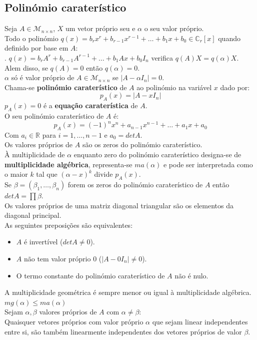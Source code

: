 \documentclass[]{report}
\begin{document}
\subsection{Polinómio caraterístico}
Seja $A\in \mathcal{M}_{n \times n}$, $X$ um vetor próprio seu e $\alpha$ o seu valor próprio.\\[5mm]
Todo o polinómio  $q(x) = b_r x^r + b_{r-1} x^{r-1} + \dots + b_1 x + b_0 \in \mathbb{C}_r[x]$ quando definido por base em $A$:\\
.\hspace{25mm} $q(x) = b_r A^r + b_{r-1} A^{r-1} + \dots + b_1 A x + b_0 I_n$ verifica $q(A)X = q(\alpha)X$.\\
Alem disso, se $q(A) = 0$ então $q(\alpha) = 0$.\\[2mm]
$\alpha$ só é valor próprio de $A \in \mathcal{M}_{n \times n}$ se $|A - \alpha I_n| = 0$.\\
Chama-se \textbf{polinómio caraterístico} de $A$ ao polinómio na variável $x$ dado por:
$$p_A(x) = |A - x I_n|$$
$p_A(x) = 0$ é a \textbf{equação caraterística} de $A$.\\
O seu polinómio caraterístico de $A$ é:
$$p_A(x) = (-1)^n x^n + a_{n-1} x ^{n-1} + \dots + a_1 x + a_0$$
Com $a_i \in \mathbb{R}$ para $i=1, \dots , n-1$ e $a_0 = det A$.\\
Os valores próprios de $A$ são os zeros do polinómio caraterístico.\\[2mm]
À multiplicidade de $\alpha$ enquanto zero do polinómio caraterístico designa-se de \textbf{multiplicidade algébrica}, representa-se $ma(\alpha)$ e  pode ser interpretada como o maior $k$ tal que $(\alpha - x)^k$ divide $p_A(x)$.\\[2mm]
Se $\beta = (\beta_1, \dots, \beta_n)$ forem os zeros do polinómio caraterístico de $A$ então $det A = \prod \beta$.\\[2mm]
Os valores próprios de uma matriz diagonal triangular são os elementos da diagonal principal.\\[2mm]
As seguintes preposições são equivalentes:
\begin{itemize}
\item $A$ é invertível ($det A \neq 0$).
\item $A$ não tem valor próprio $0$ ($|A - 0 I_n| \neq 0$).
\item O termo constante do polinómio caraterístico de $A$ não é nulo.
\end{itemize}
A multiplicidade geométrica é sempre menor ou igual à multiplicidade algébrica. $mg(\alpha) \leq ma(\alpha)$\\[2mm]
Sejam $\alpha, \beta$ valores próprios de $A$ com $\alpha \neq \beta$:\\
Quaisquer vetores próprios com valor próprio $\alpha$ que sejam linear independentes entre si, são também linearmente independentes dos vetores próprios de valor $\beta$.
\end{document}

